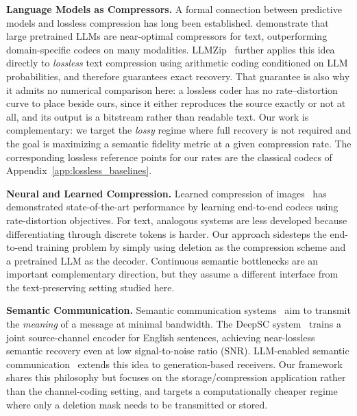 \documentclass[11pt]{article}
\begin{document}
\textbf{Language Models as Compressors.}
A formal connection between predictive models and lossless
compression has long been established. \citet{deletang2024language} demonstrate
that large pretrained LLMs are near-optimal compressors for
text, outperforming domain-specific codecs on many modalities.
LLMZip~\citep{valmeekam2023llmzip} further applies this idea
directly to \emph{lossless} text compression using arithmetic coding
conditioned on LLM probabilities, and therefore guarantees exact
recovery. That guarantee is also why it admits no numerical comparison
here: a lossless coder has no rate--distortion curve to place beside ours,
since it either reproduces the source exactly or not at all, and its output
is a bitstream rather than readable text. Our work is complementary: we
target the \emph{lossy} regime where full recovery is not required and the
goal is maximizing a semantic fidelity metric at a given compression rate.
The corresponding lossless reference points for our rates are the classical
codecs of Appendix~\ref{app:lossless_baselines}.

\textbf{Neural and Learned Compression.}
Learned compression of images~\citep{minnen2018joint,mandt2019deep}
has demonstrated state-of-the-art performance by learning
end-to-end codecs using rate-distortion objectives.  For text,
analogous systems are less developed because differentiating
through discrete tokens is harder.  Our approach sidesteps the
end-to-end training problem by simply using deletion as the
compression scheme and a pretrained LLM as the decoder. Continuous
semantic bottlenecks are an important complementary direction, but
they assume a different interface from the text-preserving setting
studied here.

\textbf{Semantic Communication.}
Semantic communication systems~\citep{xie2021deep,salehi2025llm}
aim to transmit the \emph{meaning} of a message at minimal
bandwidth.  The DeepSC system~\citep{xie2021deep} trains a
joint source-channel encoder for English sentences, achieving
near-lossless semantic recovery even at low signal-to-noise ratio (SNR).  LLM-enabled
semantic communication~\citep{salehi2025llm} extends
this idea to generation-based receivers.  Our framework shares
this philosophy but focuses on the storage/compression
application rather than the channel-coding setting,
and targets a computationally cheaper regime where only a
deletion mask needs to be transmitted or stored.
\end{document}
